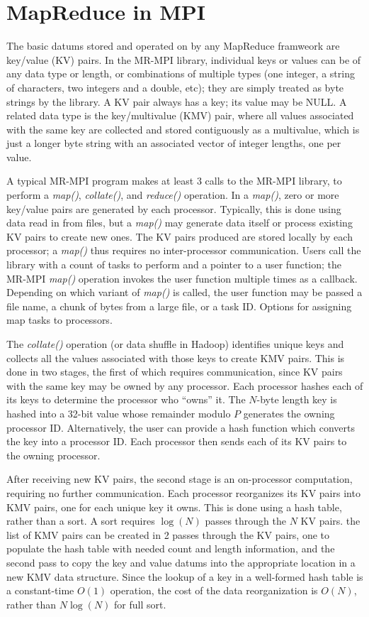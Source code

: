 \section{MapReduce in MPI}
\label{sec:mr}

The basic datums stored and operated on by any MapReduce framweork are
key/value (KV) pairs.  In the MR-MPI library, individual keys or
values can be of any data type or length, or combinations of multiple
types (one integer, a string of characters, two integers and a double,
etc); they are simply treated as byte strings by the library.  A KV
pair always has a key; its value may be NULL.  A related data type is
the key/multivalue (KMV) pair, where all values associated with the
same key are collected and stored contiguously as a multivalue, which
is just a longer byte string with an associated vector of integer
lengths, one per value.

A typical MR-MPI program makes at least 3 calls to the MR-MPI library,
to perform a {\it map()}, {\it collate()}, and {\it reduce()}
operation.  In a {\it map()}, zero or more key/value pairs are
generated by each processor.  Typically, this is done using data read
in from files, but a {\it map()} may generate data itself or process
existing KV pairs to create new ones.  The KV pairs produced are
stored locally by each processor; a {\it map()} thus requires no
inter-processor communication.  Users call the library with a count of
tasks to perform and a pointer to a user function; the MR-MPI {\it
map()} operation invokes the user function multiple times as a
callback.  Depending on which variant of {\it map()} is called, the
user function may be passed a file name, a chunk of bytes from a large
file, or a task ID.  Options for assigning map tasks to processors.

The {\it collate()} operation (or data shuffle in Hadoop) identifies
unique keys and collects all the values associated with those keys to
create KMV pairs.  This is done in two stages, the first of which
requires communication, since KV pairs with the same key may be owned
by any processor.  Each processor hashes each of its keys to determine
the processor who ``owns'' it.  The $N$-byte length key is hashed into
a 32-bit value whose remainder modulo $P$ generates the owning
processor ID.  Alternatively, the user can provide a hash function
which converts the key into a processor ID.  Each processor then sends
each of its KV pairs to the owning processor.

After receiving new KV pairs, the second stage is an on-processor
computation, requiring no further communication.  Each processor
reorganizes its KV pairs into KMV pairs, one for each unique key it
owns.  This is done using a hash table, rather than a sort.  A sort
requires $\log(N)$ passes through the $N$ KV pairs.  the list of KMV
pairs can be created in 2 passes through the KV pairs, one to populate
the hash table with needed count and length information, and the
second pass to copy the key and value datums into the appropriate
location in a new KMV data structure.  Since the lookup of a key in a
well-formed hash table is a constant-time $O(1)$ operation, the cost
of the data reorganization is $O(N)$, rather than $N\log(N)$ for full
sort.

